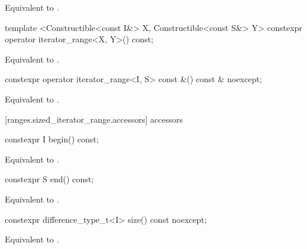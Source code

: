 \begin{itemdescr}
\pnum
\returns Equivalent to .
\end{itemdescr}

%
\begin{itemdecl}
template <Constructible<const I&> X, Constructible<const S&> Y>
  constexpr operator iterator_range<X, Y>() const;
\end{itemdecl}

\begin{itemdescr}
\pnum
\returns Equivalent to .
\end{itemdescr}

%
\begin{itemdecl}
constexpr operator iterator_range<I, S> const &() const & noexcept;
\end{itemdecl}

\begin{itemdescr}
\pnum
\returns Equivalent to .
\end{itemdescr}

[ranges.sized_iterator_range.accessors]{ accessors}

%
\begin{itemdecl}
constexpr I begin() const;
\end{itemdecl}

\begin{itemdescr}
\pnum
\returns Equivalent to .
\end{itemdescr}

%
\begin{itemdecl}
constexpr S end() const;
\end{itemdecl}

\begin{itemdescr}
\pnum
\returns Equivalent to .
\end{itemdescr}

%
\begin{itemdecl}
constexpr difference_type_t<I> size() const noexcept;
\end{itemdecl}

\begin{itemdescr}
\pnum
\returns Equivalent to .
\end{itemdescr}


